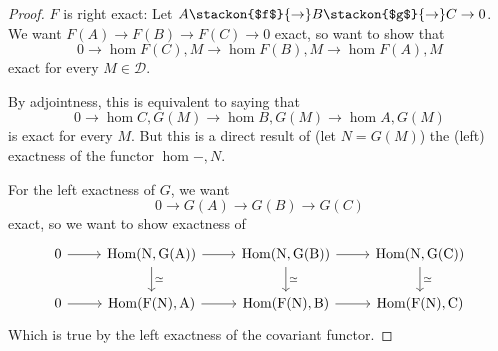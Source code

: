 \begin{proof}
    $F$ is right exact:
    Let $A\stackon{$f$}{\to} B \stackon{$g$}{\to} C\to 0$. We want $F(A)\to F(B)\to F(C)\to 0$ exact, so want to show that \[
   0 \to \hom{F(C),M}\to \hom{F(B),M}\to \hom{F(A),M}    \]
    exact for every $M\in \mathcal{D}.$

    By adjointness, this is equivalent to saying that 
    \[
    0 \to \hom{C,G(M)}\to \hom{B,G(M)}\to \hom{A,G(M)}  \] is exact for every $M$. But this is a direct result of (let $N=G(M)$) the (left) exactness of the functor $\hom{-,N}$.

    For the left exactness of $G$, we want \[
    0\to G(A)\to G(B)\to G(C)
    \] exact, so we want to show exactness of \[\begin{tikzcd}
	0 & {\rm{Hom}(N,G(A))} & {\rm{Hom}(N,G(B))} & {\rm{Hom}(N,G(C))} \\
	0 & {\rm{Hom}(F(N),A)} & {\rm{Hom}(F(N),B)} & {\rm{Hom}(F(N),C)}
	\arrow[from=1-1, to=1-2]
	\arrow[from=1-2, to=1-3]
	\arrow["\simeq", from=1-2, to=2-2]
	\arrow[from=1-3, to=1-4]
	\arrow["\simeq", from=1-3, to=2-3]
	\arrow["\simeq", from=1-4, to=2-4]
	\arrow[from=2-1, to=2-2]
	\arrow[from=2-2, to=2-3]
	\arrow[from=2-3, to=2-4]
\end{tikzcd}\]
Which is true by the left exactness of the covariant functor.
\end{proof}
